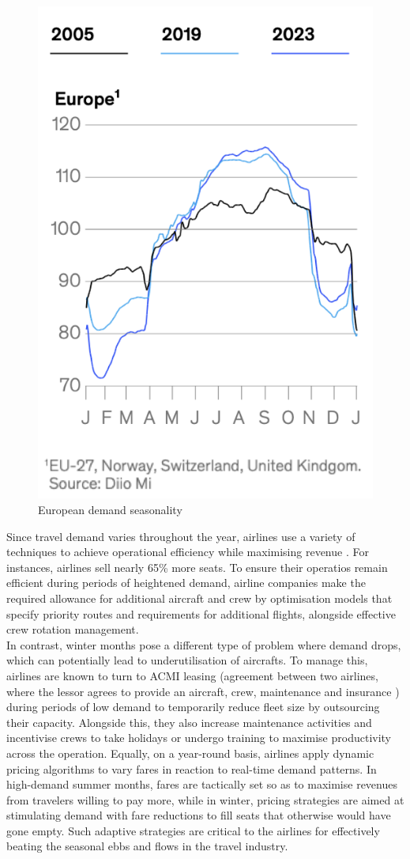 \begin{figure}[!ht]
    \centering
    \includegraphics[width=.3\textwidth]{Figures/European Demand.png}
    \caption{European demand seasonality \cite{flight_seasonnality_challenges}}
    \label{fig:European_demand_seasonality}
\end{figure}


Since travel demand varies throughout the year, airlines use a variety of techniques to achieve operational efficiency while maximising revenue \cite{flight_seasonnality_challenges}. For instances, airlines sell nearly 65\% more seats. To ensure their operatios remain efficient during periods of heightened demand, airline companies make the required allowance for additional aircraft and crew by optimisation models that specify priority routes and requirements for additional flights, alongside effective crew rotation management.
\\In contrast, winter months pose a different type of problem where demand drops, which can potentially lead to underutilisation of aircrafts. To manage this, airlines are known to turn to ACMI leasing (agreement between two airlines, where the lessor agrees to provide an aircraft, crew, maintenance and insurance \cite{acmi_def}) during periods of low demand to temporarily reduce fleet size by outsourcing their capacity. Alongside this, they also increase maintenance activities and incentivise crews to take holidays or undergo training to maximise productivity across the operation. Equally, on a year-round basis, airlines apply dynamic pricing algorithms to vary fares in reaction to real-time demand patterns. In high-demand summer months, fares are tactically set so as to maximise revenues from travelers willing to pay more, while in winter, pricing strategies are aimed at stimulating demand with fare reductions to fill seats that otherwise would have gone empty. Such adaptive strategies are critical to the airlines for effectively beating the seasonal ebbs and flows in the travel industry.

